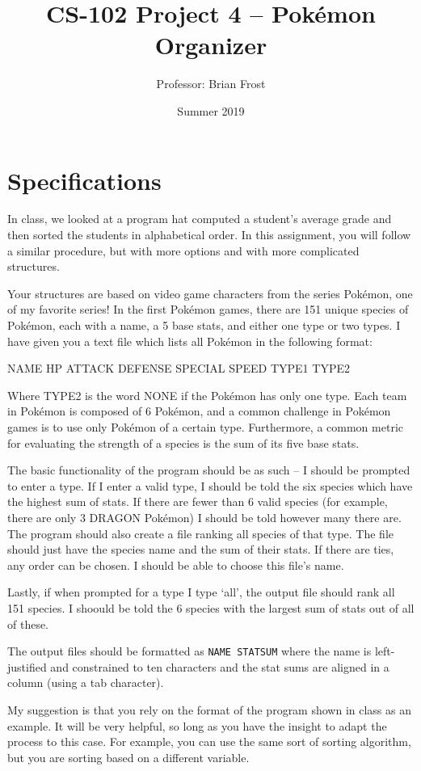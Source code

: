 \documentclass{article}
\title{CS-102 Project 4 -- Pok\'emon Organizer}
\author{Professor: Brian Frost}
\date{Summer 2019}
\begin{document}
\maketitle

\section*{Specifications}

In class, we looked at a program hat computed a student's average grade and then sorted the students in alphabetical order. In this assignment, you will follow a similar procedure, but with more options and with more complicated structures.

Your structures are based on video game characters from the series Pok\'emon, one of my favorite series! In the first Pok\'emon games, there are 151 unique species of Pok\'emon, each with a name, a 5 base stats, and either one type or two types. I have given you a text file which lists all Pok\'emon in the following format:

\noindent NAME HP ATTACK DEFENSE SPECIAL SPEED TYPE1 TYPE2

Where TYPE2 is the word NONE if the Pok\'emon has only one type. Each team in Pok\'emon is composed of 6 Pok\'emon, and a common challenge in Pok\'emon games is to use only Pok\'emon of a certain type. Furthermore, a common metric for evaluating the strength of a species is the sum of its five base stats.

The basic functionality of the program should be as such -- I should be prompted to enter a type. If I enter a valid type, I should be told the six species which have the highest sum of stats. If there are fewer than 6 valid species (for example, there are only 3 DRAGON Pok\'emon) I should be told however many there are. The program should also create a file ranking all species of that type. The file should just have the species name and the sum of their stats. If there are ties, any order can be chosen. I should be able to choose this file's name.

Lastly, if when prompted for a type I type `all', the output file should rank all 151 species. I shoould be told the 6 species with the largest sum of stats out of all of these.

The output files should be formatted as \texttt{NAME STATSUM} where the name is left-justified and constrained to ten characters and the stat sums are aligned in a column (using a tab character).

My suggestion is that you rely on the format of the program shown in class as an example. It will be very helpful, so long as you have the insight to adapt the process to this case. For example, you can use the same sort of sorting algorithm, but you are sorting based on a different variable.
\end{document}
